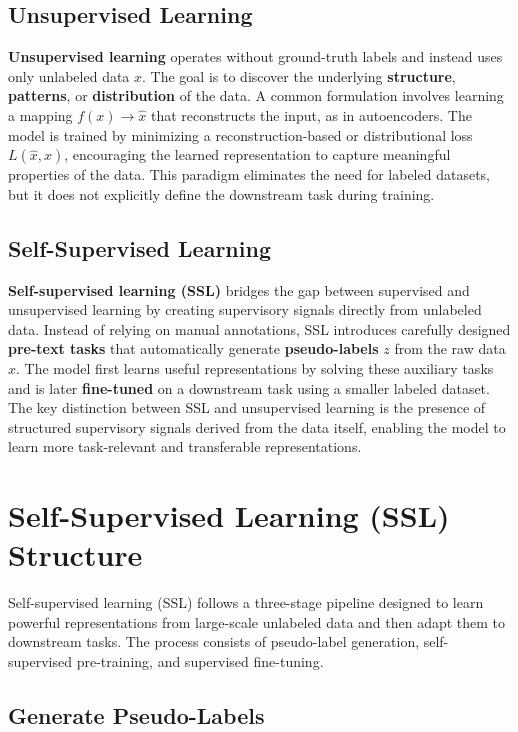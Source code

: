 \documentclass{article}
\begin{document}
\subsection*{Unsupervised Learning}

\textbf{Unsupervised learning} operates without ground-truth labels and instead uses only unlabeled data $x$. The goal is to discover the underlying \textbf{structure}, \textbf{patterns}, or \textbf{distribution} of the data. A common formulation involves learning a mapping $f(x)\rightarrow\hat{x}$ that reconstructs the input, as in autoencoders. The model is trained by minimizing a reconstruction-based or distributional loss $L(\hat{x},x)$, encouraging the learned representation to capture meaningful properties of the data. This paradigm eliminates the need for labeled datasets, but it does not explicitly define the downstream task during training.

\subsection*{Self-Supervised Learning}

\textbf{Self-supervised learning (SSL)} bridges the gap between supervised and unsupervised learning by creating supervisory signals directly from unlabeled data. Instead of relying on manual annotations, SSL introduces carefully designed \textbf{pre-text tasks} that automatically generate \textbf{pseudo-labels} $z$ from the raw data $x$. The model first learns useful representations by solving these auxiliary tasks and is later \textbf{fine-tuned} on a downstream task using a smaller labeled dataset. The key distinction between SSL and unsupervised learning is the presence of structured supervisory signals derived from the data itself, enabling the model to learn more task-relevant and transferable representations.

\section{Self-Supervised Learning (SSL) Structure}

Self-supervised learning (SSL) follows a three-stage pipeline designed to learn powerful representations from large-scale unlabeled data and then adapt them to downstream tasks. The process consists of pseudo-label generation, self-supervised pre-training, and supervised fine-tuning.

\subsection*{Generate Pseudo-Labels}
\end{document}
